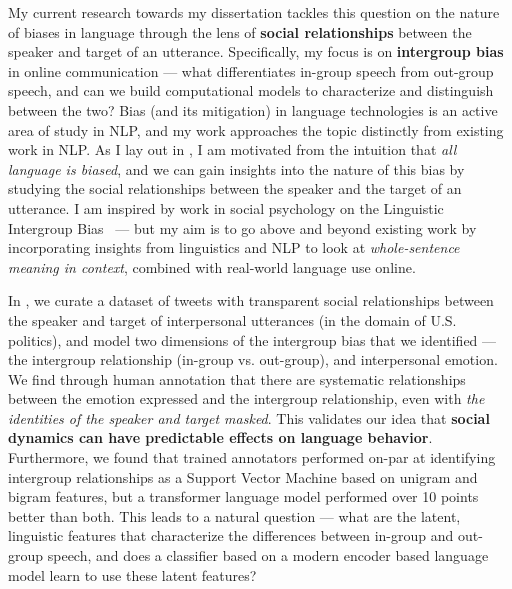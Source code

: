 \documentclass[11pt, letterpaper, biblatex]{practical-report}
\begin{document}
My current research towards my dissertation tackles this question on the nature of biases in language through the lens of \textbf{social relationships} between the speaker and target of an utterance. Specifically, my focus is on \textbf{intergroup bias} in online communication --- what differentiates in-group speech from out-group speech, and can we build computational models to characterize and distinguish between the two? Bias (and its mitigation) in language technologies is an active area of study in NLP, and my work approaches the topic distinctly from existing work in NLP. As I lay out in \citet{govindarajan-etal-2023-people}, I am motivated from the intuition that \emph{all language is biased}, and we can gain insights into the nature of this bias by studying the social relationships between the speaker and the target of an utterance. I am inspired by work in social psychology on the Linguistic Intergroup Bias~\citep[LIB,][]{maass_linguistic_1999} --- but my aim is to go above and beyond existing work by incorporating insights from linguistics and NLP to look at \emph{whole-sentence meaning in context}, combined with real-world language use online.

In \citet{govindarajan-etal-2023-people}, we curate a dataset of tweets with transparent social relationships between the speaker and target of interpersonal utterances (in the domain of U.S. politics), and model two dimensions of the intergroup bias that we identified --- the intergroup relationship (in-group vs. out-group), and interpersonal emotion. We find through human annotation that there are systematic relationships between the emotion expressed and the intergroup relationship, even with \emph{the identities of the speaker and target masked}. This validates our idea that \textbf{social dynamics can have predictable effects on language behavior}. Furthermore, we found that trained annotators performed on-par at identifying intergroup relationships as a Support Vector Machine based on unigram and bigram features, but a transformer language model performed over 10 points better than both. This leads to a natural question --- what are the latent, linguistic features that characterize the differences between in-group and out-group speech, and does a classifier based on a modern encoder based language model learn to use these latent features?
\end{document}

